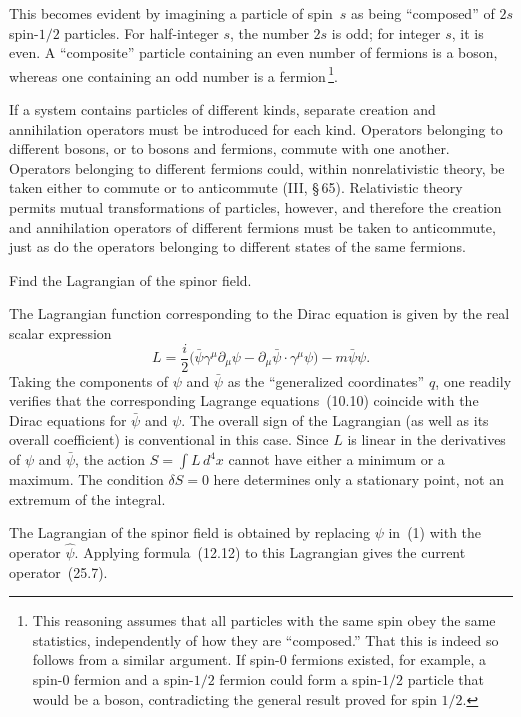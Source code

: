 This becomes evident by imagining a particle of spin~$s$ as being ``composed'' of $2s$ spin-$1/2$ particles. For half-integer $s$, the number $2s$ is odd; for integer $s$, it is even. A ``composite'' particle containing an even number of fermions is a boson, whereas one containing an odd number is a fermion\,\footnote{This reasoning assumes that all particles with the same spin obey the same statistics, independently of how they are ``composed.'' That this is indeed so follows from a similar argument. If spin-0 fermions existed, for example, a spin-0 fermion and a spin-$1/2$ fermion could form a spin-$1/2$ particle that would be a boson, contradicting the general result proved for spin $1/2$.}.

If a system contains particles of different kinds, separate creation and annihilation operators must be introduced for each kind. Operators belonging to different bosons, or to bosons and fermions, commute with one another. Operators belonging to different fermions could, within nonrelativistic theory, be taken either to commute or to anticommute (III, \S\,65). Relativistic theory permits mutual transformations of particles, however, and therefore the creation and annihilation operators of different fermions must be taken to anticommute, just as do the operators belonging to different states of the same fermions.

\ProblemHeading

Find the Lagrangian of the spinor field.

\SolutionHeading The Lagrangian function corresponding to the Dirac equation is given by the real scalar expression
\begin{equation}
L = \frac{i}{2}\bigl(\bar\psi\gamma^\mu\partial_\mu\psi - \partial_\mu\bar\psi\cdot\gamma^\mu\psi\bigr) - m\bar\psi\psi.
\tag*{(1)}
\end{equation}
Taking the components of $\psi$ and $\bar\psi$ as the ``generalized coordinates'' $q$, one readily verifies that the corresponding Lagrange equations~(10.10) coincide with the Dirac equations for $\bar\psi$ and $\psi$. The overall sign of the Lagrangian (as well as its overall coefficient) is conventional in this case. Since $L$ is linear in the derivatives of $\psi$ and $\bar\psi$, the action $S = \int L\,d^4x$ cannot have either a minimum or a maximum. The condition $\delta S = 0$ here determines only a stationary point, not an extremum of the integral.

The Lagrangian of the spinor field is obtained by replacing $\psi$ in~(1) with the operator $\widehat\psi$. Applying formula~(12.12) to this Lagrangian gives the current operator~(25.7).
